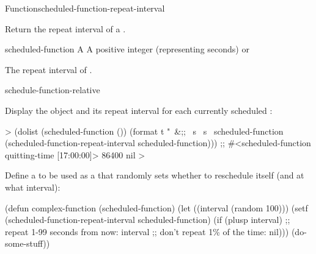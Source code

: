\begin{functiondoc}{Function}{scheduled-function-repeat-interval}%
  {
    \returns{} }
%
%

\fnsyntax

\fnpurpose Return the repeat interval of a .

\fnsetf
{}%
  {}{}

\fnpackage {}

\fnmodule {}

\fnargs
\begin{args}{scheduled-function}
 A 
 A positive integer (representing seconds) or \nil
\end{args}

\fnreturns The repeat interval of . 

\begin{alsos}{schedule-function-relative}
\end{alsos}

%
\fnexamples
% 
Display the  object and its repeat interval
for each currently scheduled :
%
\W\supp
\begin{example}
  > (dolist (scheduled-function ())
     (format t "~&;; ~s ~s~%
             scheduled-function
             (scheduled-function-repeat-interval scheduled-function)))
  ;; #<scheduled-function quitting-time [17:00:00]> 86400
  nil
  >
\end{example}

Define a  to be used as a  that
randomly sets whether to reschedule itself (and at what interval):
%
\W\supp
\begin{example}
  (defun complex-function (scheduled-function)
    (let ((interval (random 100)))
      (setf (scheduled-function-repeat-interval scheduled-function)
            (if (plusp interval) 
                ;; repeat 1-99 seconds from now:
                interval
                ;; don't repeat 1\% of the time:
                nil)))
    (do-some-stuff))
\end{example}

\end{functiondoc}

